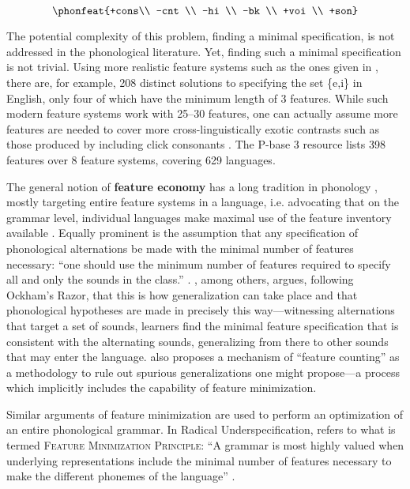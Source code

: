 \documentclass[11pt,a4paper]{article}
\begin{document}
\begin{equation}
\phonfeat{+cons\\ -cnt \\ -hi \\ -bk \\ +voi \\ +son}
\end{equation}

The potential complexity of this problem, finding a minimal specification, is not addressed in the phonological literature. Yet, finding such a minimal specification is not trivial. Using more realistic feature systems such as the ones given in , there are, for example, 208 distinct solutions to specifying the set \{e,i\} in English, only four of which have the minimum length of 3 features.  While such modern feature systems work with 25--30 features, one can actually assume more features are needed to cover more cross-linguistically exotic contrasts such as those produced by including click consonants \cite{miller2011}.  The P-base 3 resource \cite{mielkepbase} lists 398 features over 8 feature systems, covering 629 languages.

The general notion of {\bf feature economy} has a long tradition in phonology \cite{jakobson1942,martinet1955,clements2003}, mostly targeting entire feature systems in a language, i.e. advocating that on the grammar level, individual languages make maximal use of the feature inventory available \cite{fant1966}.  Equally prominent is the assumption that any specification of phonological alternations be made with the minimal number of features necessary: ``one should use the minimum number of features required to specify all and only the sounds in the class.'' \cite[p.282]{zsiga2012}.  , among others, argues, following Ockham's Razor, that this is how generalization can take place and that phonological hypotheses are made in precisely this way---witnessing alternations that target a set of sounds, learners find the minimal feature specification that is consistent with the alternating sounds, generalizing from there to other sounds that may enter the language.  also proposes a mechanism of ``feature counting'' as a methodology to rule out spurious generalizations one might propose---a process which implicitly includes the capability of feature minimization.

Similar arguments of feature minimization are used to perform an optimization of an entire phonological grammar. In Radical Underspecification,  refers to what is termed \textsc{Feature Minimization Principle}: ``A grammar is most highly valued when underlying representations include the minimal number of features necessary to make the different phonemes of the language'' \citep[p. 48]{archangeli1984}.
\end{document}
